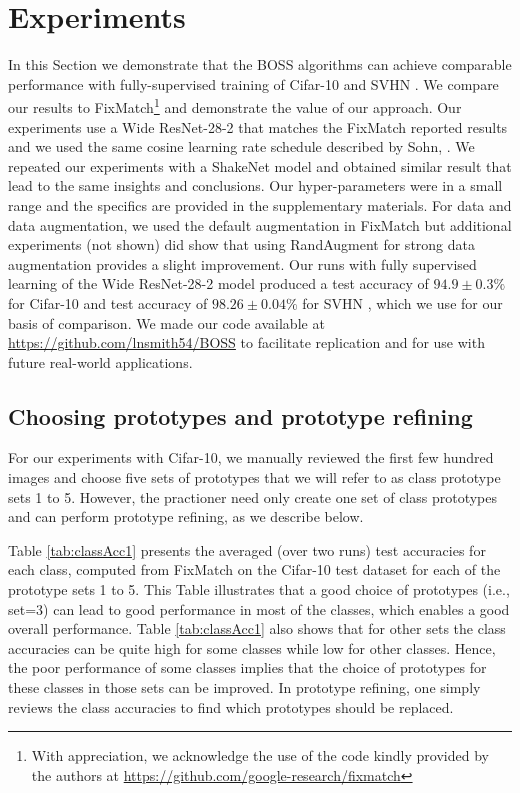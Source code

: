 \documentclass[final]{cvpr}
\begin{document}
\section{Experiments}
\label{sec:exp}

In this Section we demonstrate that the BOSS algorithms can achieve comparable performance with fully-supervised training of Cifar-10 \cite{krizhevsky2009learning} and SVHN \cite{netzer2011reading}.
We compare our results to FixMatch\footnote{With appreciation, we acknowledge the use of the code kindly provided by the authors at \url{https://github.com/google-research/fixmatch} } \cite{sohn2020fixmatch} and demonstrate the value of our approach.
Our experiments use a Wide ResNet-28-2 \cite{zagoruyko2016wide} that matches the FixMatch reported results and we used the same cosine learning rate schedule described by Sohn, \etal \cite{sohn2020fixmatch}. 
We repeated our experiments with a ShakeNet model \cite{gastaldi2017shake} and obtained similar result that lead to the same insights and conclusions.
Our hyper-parameters were in a small range and the specifics are provided in the supplementary materials.
For data and data augmentation, we used the default augmentation in FixMatch but additional experiments (not shown) did show that using RandAugment \cite{cubuk2019randaugment} for strong data augmentation provides  a slight improvement.
Our runs with fully supervised learning of the Wide ResNet-28-2 model produced a test accuracy of $ 94.9 \pm 0.3 \% $ for Cifar-10 \cite{krizhevsky2009learning} and  test accuracy of $ 98.26 \pm 0.04 \% $ for SVHN \cite{netzer2011reading}, which we use for our basis of comparison.
We made our code available at \url{https://github.com/lnsmith54/BOSS} to facilitate replication and for use with future real-world applications.




\subsection{Choosing prototypes and prototype refining}
\label{sec:expPrto}

For our experiments with Cifar-10, we manually reviewed the first few hundred images and choose five sets of prototypes that we will refer to as class prototype sets 1 to 5.
However, the practioner need only create one set of class prototypes and can perform prototype refining, as we describe below.

Table \ref{tab:classAcc1} presents the averaged (over two runs) test accuracies for each class, computed from FixMatch on the Cifar-10 test dataset for each of the prototype sets 1 to 5.
This Table illustrates that a good choice of prototypes (i.e., set=3) can lead to good performance in most of the classes, which enables a good overall performance.
Table \ref{tab:classAcc1} also shows that for other sets the class accuracies can be quite high for some classes while low for other classes.
Hence, the poor performance of some classes implies that the choice of prototypes for these classes in those sets can be improved.
In prototype refining, one simply reviews the class accuracies to find which prototypes should be replaced.
\end{document}
